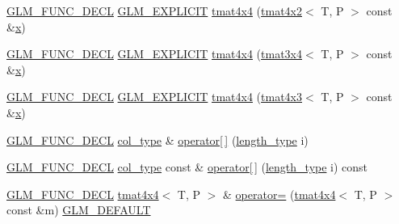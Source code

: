 \begin{DoxyCompactItemize}
\item 
\mbox{\hyperlink{setup_8hpp_ab2d052de21a70539923e9bcbf6e83a51}{G\+L\+M\+\_\+\+F\+U\+N\+C\+\_\+\+D\+E\+CL}} \mbox{\hyperlink{setup_8hpp_a6c74f5a5e7b134ab69023ff9a30d4d5d}{G\+L\+M\+\_\+\+E\+X\+P\+L\+I\+C\+IT}} \mbox{\hyperlink{structglm_1_1tmat4x4_a23f17aeae300219c962944a180316819}{tmat4x4}} (\mbox{\hyperlink{structglm_1_1tmat4x2}{tmat4x2}}$<$ T, P $>$ const \&\mbox{\hyperlink{glad_8h_a92d0386e5c19fb81ea88c9f99644ab1d}{x}})
\item 
\mbox{\hyperlink{setup_8hpp_ab2d052de21a70539923e9bcbf6e83a51}{G\+L\+M\+\_\+\+F\+U\+N\+C\+\_\+\+D\+E\+CL}} \mbox{\hyperlink{setup_8hpp_a6c74f5a5e7b134ab69023ff9a30d4d5d}{G\+L\+M\+\_\+\+E\+X\+P\+L\+I\+C\+IT}} \mbox{\hyperlink{structglm_1_1tmat4x4_ad15d9ef57895ed333b7f6d857ac14306}{tmat4x4}} (\mbox{\hyperlink{structglm_1_1tmat3x4}{tmat3x4}}$<$ T, P $>$ const \&\mbox{\hyperlink{glad_8h_a92d0386e5c19fb81ea88c9f99644ab1d}{x}})
\item 
\mbox{\hyperlink{setup_8hpp_ab2d052de21a70539923e9bcbf6e83a51}{G\+L\+M\+\_\+\+F\+U\+N\+C\+\_\+\+D\+E\+CL}} \mbox{\hyperlink{setup_8hpp_a6c74f5a5e7b134ab69023ff9a30d4d5d}{G\+L\+M\+\_\+\+E\+X\+P\+L\+I\+C\+IT}} \mbox{\hyperlink{structglm_1_1tmat4x4_a1826c29cae061983cde9d9dc860bc637}{tmat4x4}} (\mbox{\hyperlink{structglm_1_1tmat4x3}{tmat4x3}}$<$ T, P $>$ const \&\mbox{\hyperlink{glad_8h_a92d0386e5c19fb81ea88c9f99644ab1d}{x}})
\item 
\mbox{\hyperlink{setup_8hpp_ab2d052de21a70539923e9bcbf6e83a51}{G\+L\+M\+\_\+\+F\+U\+N\+C\+\_\+\+D\+E\+CL}} \mbox{\hyperlink{structglm_1_1tmat4x4_ac879ae9669b754551245231ee992a1ea}{col\+\_\+type}} \& \mbox{\hyperlink{structglm_1_1tmat4x4_a4be08a6a3f8cb1f0954c2d0347961582}{operator\mbox{[}$\,$\mbox{]}}} (\mbox{\hyperlink{structglm_1_1tmat4x4_aff2734210dc0f3c3c60c49bb1f3e8864}{length\+\_\+type}} i)
\item 
\mbox{\hyperlink{setup_8hpp_ab2d052de21a70539923e9bcbf6e83a51}{G\+L\+M\+\_\+\+F\+U\+N\+C\+\_\+\+D\+E\+CL}} \mbox{\hyperlink{structglm_1_1tmat4x4_ac879ae9669b754551245231ee992a1ea}{col\+\_\+type}} const  \& \mbox{\hyperlink{structglm_1_1tmat4x4_a0b1cbaaefe0ad2cb8f7047e957e58841}{operator\mbox{[}$\,$\mbox{]}}} (\mbox{\hyperlink{structglm_1_1tmat4x4_aff2734210dc0f3c3c60c49bb1f3e8864}{length\+\_\+type}} i) const
\item 
\mbox{\hyperlink{setup_8hpp_ab2d052de21a70539923e9bcbf6e83a51}{G\+L\+M\+\_\+\+F\+U\+N\+C\+\_\+\+D\+E\+CL}} \mbox{\hyperlink{structglm_1_1tmat4x4}{tmat4x4}}$<$ T, P $>$ \& \mbox{\hyperlink{structglm_1_1tmat4x4_aeccf1c71ba2e06f4ce199da93767928e}{operator=}} (\mbox{\hyperlink{structglm_1_1tmat4x4}{tmat4x4}}$<$ T, P $>$ const \&m) \mbox{\hyperlink{setup_8hpp_aefce7051c376a64ba89fa93a9f63bc2c}{G\+L\+M\+\_\+\+D\+E\+F\+A\+U\+LT}}

\end{DoxyCompactItemize}

